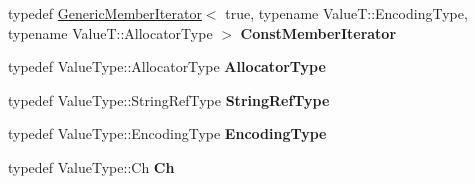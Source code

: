 \begin{DoxyCompactItemize}
typedef \hyperlink{class_generic_member_iterator}{Generic\+Member\+Iterator}$<$ true, typename Value\+T\+::\+Encoding\+Type, typename Value\+T\+::\+Allocator\+Type $>$ {\bfseries Const\+Member\+Iterator}
\item 
\mbox{\label{class_generic_object_a00c8cee952d5ebadc5e1c309aa489ad9}} 
typedef Value\+Type\+::\+Allocator\+Type {\bfseries Allocator\+Type}
\item 
\mbox{\label{class_generic_object_a9b8381fc96f5f89b2163b052ed66cc59}} 
typedef Value\+Type\+::\+String\+Ref\+Type {\bfseries String\+Ref\+Type}
\item 
\mbox{\label{class_generic_object_a96ebfdde095e2ce42535d15ae5dc58ef}} 
typedef Value\+Type\+::\+Encoding\+Type {\bfseries Encoding\+Type}
\item 
\mbox{\label{class_generic_object_ac6747e5baa13e15bcea1658b5624647a}} 
typedef Value\+Type\+::\+Ch {\bfseries Ch}
\end{DoxyCompactItemize}
